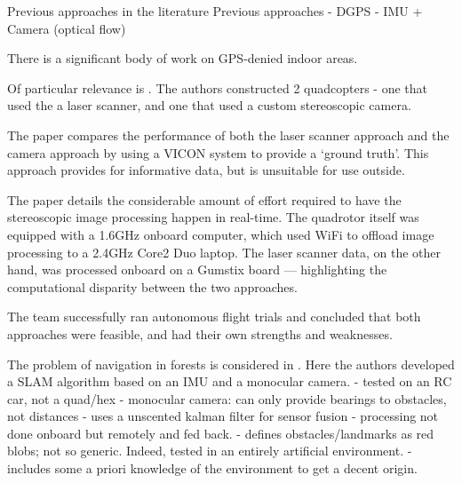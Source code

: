 \documentclass[12pt,oneside,a4paper]{book}
\begin{document}
Previous approaches in the literature
Previous approaches
- DGPS
- IMU + Camera (optical flow)


There is a significant body of work on GPS-denied indoor areas.

Of particular relevance is \cite{achtelik2009stereo}. The authors
constructed 2 quadcopters - one that used the a laser scanner, and one
that used a custom stereoscopic camera. 

The paper compares the performance of both the laser scanner
approach and the camera approach by using a VICON system to provide a
`ground truth'. This approach provides for informative data, but is
unsuitable for use outside.

The paper details the considerable amount of effort required to have
the stereoscopic image processing happen in real-time. The quadrotor
itself was equipped with a 1.6GHz onboard computer, which used WiFi to
offload image processing to a 2.4GHz Core2 Duo laptop. The laser
scanner data, on the other hand, was processed onboard on a Gumstix
board --- highlighting the computational disparity between the two
approaches.


The team successfully ran autonomous flight trials and concluded that
both approaches were feasible, and had their own strengths and
weaknesses.




The problem of navigation in forests is considered in
\cite{langelaan2005towards}. Here the authors developed a SLAM
algorithm based on an IMU and a monocular camera.
- tested on an RC car, not a quad/hex
- monocular camera: can only provide bearings to obstacles, not
distances
- uses a unscented kalman filter for sensor fusion
- processing not done onboard but remotely and fed back.
- defines obstacles/landmarks as red blobs; not so generic. Indeed,
tested in an entirely artificial environment.
- includes some a priori knowledge of the environment to get a decent
origin. 
\end{document}
